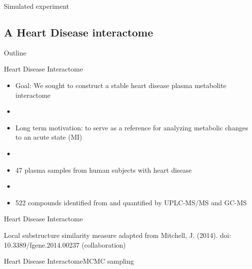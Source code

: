 \documentclass[xcolor=dvipsnames]{beamer}
\begin{document}
\begin{frame}{Simulated experiment}
	\begin{center}
	\end{center}
\end{frame}

\subsection{A Heart Disease interactome}
\begin{frame}{Outline}
	\vspace{-10.5pt}
	\tableofcontents[currentsection,subsectionstyle=show/shaded/hide]
\end{frame}
\begin{frame}{Heart Disease Interactome}
	\vspace{-15.5pt}
	\begin{itemize}
		\item Goal: We sought to construct a stable heart disease plasma metabolite interactome
		\item[]
		\item Long term motivation:  to serve as a reference for analyzing metabolic changes to an acute state (MI)
		\item[]
		\item 47 plasma samples from human subjects with heart disease
		\item[]
		\item 522 compounds identified from and quantified by UPLC-MS/MS and GC-MS
	\end{itemize}
\end{frame}

\begin{frame}{Heart Disease Interactome}
		\vspace{-15.5pt}
	\begin{center}
		
		Local substructure similarity measure adapted from Mitchell, J. (2014). doi: 10.3389/fgene.2014.00237 (collaboration)
	\end{center}
\end{frame}

\begin{frame}{Heart Disease Interactome}{MCMC sampling}
	\vspace{-10.5pt}
	\begin{center}
	\end{center}
\end{frame}
\end{document}
